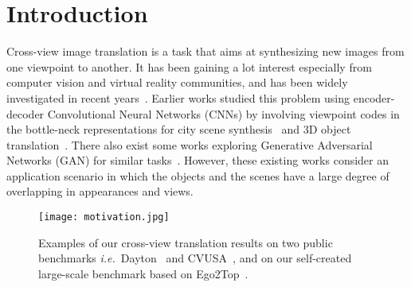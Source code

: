 \documentclass[10pt,twocolumn,letterpaper]{article}
\def\ie{\textit{i.e.}~}
\begin{document}
\section{Introduction}
\vspace{-0.08cm}
Cross-view image translation is a task that aims at synthesizing new images from one viewpoint to another.  It has been gaining a lot interest especially from computer vision and virtual reality communities, and has been widely investigated in recent years~\cite{tatarchenko2016multi,kim2017learning,zhu2018generative,regmi2018cross,zhai2017predicting,huang2017beyond,park2017transformation,zhou2016view,yang2015weakly}. Earlier works studied this problem using encoder-decoder Convolutional Neural Networks (CNNs) by involving viewpoint codes in the bottle-neck representations for city scene synthesis~\cite{zhou2016view} and 3D object translation~\cite{yang2015weakly}. There also exist some works exploring Generative Adversarial Networks (GAN) for similar tasks~\cite{park2017transformation}. However, these existing works consider an application scenario in which the objects and the scenes have a large degree of overlapping in appearances and views. 
\begin{figure}[!t]\small
	\centering
	\texttt{[image: motivation.jpg]}
	\caption{Examples of our cross-view translation results on two public benchmarks \ie Dayton~\cite{vo2016localizing} and CVUSA~\cite{workman2015wide}, and on our self-created large-scale benchmark based on Ego2Top~\cite{ardeshir2016ego2top}.}
	\label{fig:motivation fig.}
	\vspace{-0.05cm}
\end{figure}
\end{document}
